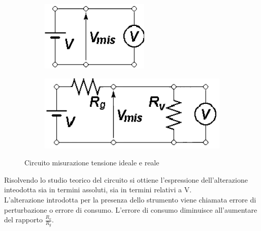 \documentclass{article}
\begin{document}
\begin{figure}
     \begin{subfigure}[]{}
         \centering
         \includegraphics[scale=0.67]{Circuito Misurazione Tensione 1.png}
         \label{fig:CircuitoMisurazioneTensione}
     \end{subfigure}
     \hfill
      \begin{subfigure}[]{}
         \centering
         \includegraphics[scale=0.67]{Circuito Misurazione Tensione 2.png}
         \label{fig:CircuitoMisurazioneTensionee}
     \end{subfigure}
     \caption{Circuito misurazione tensione ideale e reale}
     \label{fig:Circuito Misurazione Tensione}
\end{figure}
Risolvendo lo studio teorico del circuito si ottiene l’espressione dell’alterazione inteodotta sia in termini assoluti, sia in termini relativi a V. \\
L’alterazione introdotta per la presenza dello strumento viene chiamata errore di perturbazione o errore di consumo. L'errore di consumo diminuisce all'aumentare del rapporto $\frac{R_{v}}{R_{g}}$.\\
\newpage
\end{document}
